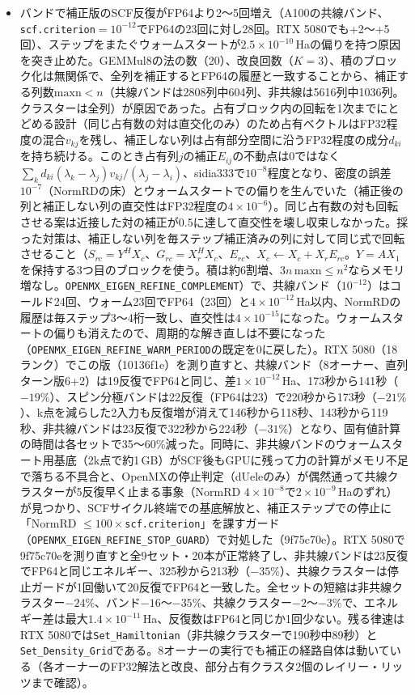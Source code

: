 \documentclass[a4paper,11pt]{ltjsarticle}
\newcommand{\code}[1]{\texttt{#1}}
\newcommand{\E}[1]{\times10^{#1}}
\begin{document}
\begin{itemize}
\item バンドで補正版のSCF反復がFP64より2〜5回増え（A100の共線バンド、\code{scf.criterion}$=10^{-12}$でFP64の23回に対し28回。RTX 5080でも+2〜+5回）、ステップをまたぐウォームスタートが$2.5\E{-10}$\,Haの偏りを持つ原因を突き止めた。GEMMul8の法の数（20）、改良回数（$K=3$）、積のブロック化は無関係で、全列を補正するとFP64の履歴と一致することから、補正する列数$\mathrm{maxn}<n$（共線バンドは2808列中604列、非共線は5616列中1036列。クラスターは全列）が原因であった。占有ブロック内の回転を1次までにとどめる設計（同じ占有数の対は直交化のみ）のため占有ベクトルはFP32程度の混合$v_{kj}$を残し、補正しない列は占有部分空間に沿うFP32程度の成分$d_{ki}$を持ち続ける。このとき占有列$j$の補正$E_{ij}$の不動点は0ではなく$\sum_k d_{ki}(\lambda_k-\lambda_j)v_{kj}/(\lambda_j-\lambda_i)$、sidia333で$10^{-8}$程度となり、密度の誤差$10^{-7}$（NormRDの床）とウォームスタートでの偏りを生んでいた（補正後の列と補正しない列の直交性はFP32程度の$4\E{-6}$）。同じ占有数の対も回転させる案は近接した対の補正が0.5に達して直交性を壊し収束しなかった。採った対策は、補正しない列を毎ステップ補正済みの列に対して同じ式で回転させること（$S_{rc}=Y^{H}X_c$、$G_{rc}=X_r^{H}X_c$、$E_{rc}$、$X_c\leftarrow X_c+X_rE_{rc}$。$Y=AX_1$を保持する3つ目のブロックを使う。積は約6割増、$3n\,\mathrm{maxn}\le n^2$ならメモリ増なし。\code{OPENMX\_EIGEN\_REFINE\_COMPLEMENT}）で、共線バンド（$10^{-12}$）はコールド24回、ウォーム23回でFP64（23回）と$4\E{-12}$\,Ha以内、NormRDの履歴は毎ステップ3〜4桁一致し、直交性は$4\E{-15}$になった。ウォームスタートの偏りも消えたので、周期的な解き直しは不要になった（\code{OPENMX\_EIGEN\_REFINE\_WARM\_PERIOD}の既定を0に戻した）。RTX 5080（18ランク）でこの版（10136f1e）を測り直すと、共線バンド（8オーナー、直列ターン版6+2）は19反復でFP64と同じ、差$1\E{-12}$\,Ha、173秒から141秒（$-19\%$）、スピン分極バンドは22反復（FP64は23）で220秒から173秒（$-21\%$）、k点を減らした2入力も反復増が消えて146秒から118秒、143秒から119秒、非共線バンドは23反復で322秒から224秒（$-31\%$）となり、固有値計算の時間は各セットで35〜60\%減った。同時に、非共線バンドのウォームスタート用基底（2k点で約1\,GB）がSCF後もGPUに残って力の計算がメモリ不足で落ちる不具合と、OpenMXの停止判定（dUeleのみ）が偶然通って共線クラスターが5反復早く止まる事象（NormRD $4\E{-8}$で$2\E{-9}$\,Haのずれ）が見つかり、SCFサイクル終端での基底解放と、補正ステップでの停止に「NormRD $\le 100\times$\code{scf.criterion}」を課すガード（\code{OPENMX\_EIGEN\_REFINE\_STOP\_GUARD}）で対処した（9f75c70e）。RTX 5080で9f75c70eを測り直すと全9セット・20本が正常終了し、非共線バンドは23反復でFP64と同じエネルギー、325秒から213秒（$-35\%$）、共線クラスターは停止ガードが1回働いて20反復でFP64と一致した。全セットの短縮は非共線クラスター$-24\%$、バンド$-16$〜$-35\%$、共線クラスター$-2$〜$-3\%$で、エネルギー差は最大$1.4\E{-11}$\,Ha、反復数はFP64と同じか1回少ない。残る律速はRTX 5080では\code{Set\_Hamiltonian}（非共線クラスターで190秒中89秒）と\code{Set\_Density\_Grid}である。8オーナーの実行でも補正の経路自体は動いている（各オーナーのFP32解法と改良、部分占有クラスタ2個のレイリー・リッツまで確認）。

\end{itemize}
\end{document}
